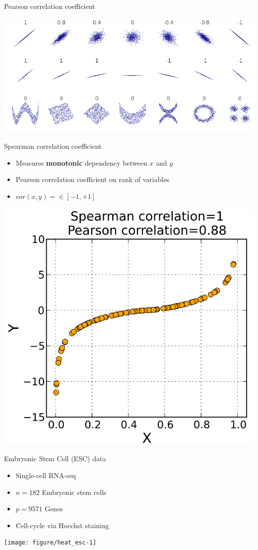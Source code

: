 \documentclass{beamer}\usepackage[]{graphicx}\usepackage[]{color}
\newenvironment{knitrout}{}{} %
\begin{document}
\begin{frame}{Pearson correlation coefficient}
  \begin{center}
    \includegraphics[width=0.8\linewidth]{pearson.png}
  \end{center}
\end{frame}

\begin{frame}{Spearman correlation coefficient}
  \begin{itemize}
    \item Measures \textbf{monotonic} dependency between $x$ and $y$
    \item Pearson correlation coefficient on rank of variables
    \item $cor(x,y) = \in \left[-1,+1\right]$
  \end{itemize}
  \begin{center}
    \includegraphics[width=0.4\linewidth]{spearman.png}
  \end{center}
\end{frame}



\begin{frame}[fragile]{Embryonic Stem Cell (ESC) data}
  \begin{itemize}
    \item Single-cell RNA-seq
    \item $n=182$ Embryonic stem cells
    \item $p=9571$ Genes
    \item Cell-cycle via Hoechst staining
  \end{itemize}
\begin{knitrout}\tiny
{}\color{fgcolor}

{\centering \texttt{[image: figure/heat\_esc-1]} 

}



\end{knitrout}
\end{frame}
\end{document}
